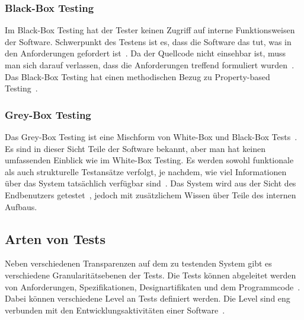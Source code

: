 \subsubsection{Black-Box Testing}

Im Black-Box Testing hat der Tester keinen Zugriff auf interne Funktionsweisen der Software.
Schwerpunkt des Testens ist es, dass die Software das tut, was in den Anforderungen gefordert ist~\cite[vgl. Specification-Based Testing]{software-testing-craftmans}.
Da der Quellcode nicht einsehbar ist, muss man sich darauf verlassen, dass die Anforderungen treffend formuliert wurden~\cite[vgl.]{testmanagment}.
Das Black-Box Testing hat einen methodischen Bezug zu Property-based Testing~\cite{property-based-testing}.

\subsubsection{Grey-Box Testing}

Das Grey-Box Testing ist eine Mischform von White-Box und Black-Box Tests~\cite[vgl.]{testmanagment}.
Es sind in dieser Sicht Teile der Software bekannt, aber man hat keinen umfassenden Einblick wie im White-Box Testing.
Es werden sowohl funktionale als auch strukturelle Testansätze verfolgt, je nachdem, wie viel Informationen über das System tatsächlich
verfügbar sind~\cite[vgl.]{graybox}.
Das System wird aus der Sicht des Endbenutzers getestet~\cite[vgl.]{testmanagment}, jedoch mit zusätzlichem Wissen über Teile des internen Aufbaus.

\subsection{Arten von Tests}

Neben verschiedenen Transparenzen auf dem zu testenden System gibt es verschiedene Granularitätsebenen der Tests.
Die Tests können abgeleitet werden von Anforderungen, Spezifikationen, Designartifikaten und dem Programmcode~\cite[vgl. 1.1.1 Testing Levels Based on Software Activity]{software-testing}.
Dabei können verschiedene Level an Tests definiert werden.
Die Level sind eng verbunden mit den Entwicklungsaktivitäten einer Software~\cite[vgl. 1.1.1]{software-testing}.

